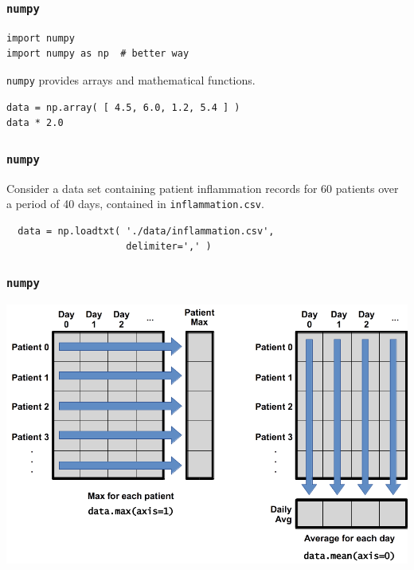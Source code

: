 \documentclass[11pt]{beamer}
\begin{document}
\begin{frame}[fragile]
  \frametitle{\texttt{numpy}}
  \Enlarge

  \begin{Verbatim}
import numpy
import numpy as np  # better way
  \end{Verbatim}
  \begin{enumerate}
  \myitem  \texttt{numpy} provides arrays and mathematical functions.
  \end{enumerate}
  \begin{Verbatim}
data = np.array( [ 4.5, 6.0, 1.2, 5.4 ] )
data * 2.0
  \end{Verbatim}
\end{frame}

\begin{frame}[fragile]
  \frametitle{\texttt{numpy}}
  \Enlarge

  Consider a data set containing patient inflammation records for 60 patients over a period of 40 days, contained in \texttt{inflammation.csv}.

  \begin{Verbatim}
  data = np.loadtxt( './data/inflammation.csv',
                     delimiter=',' )
  \end{Verbatim}
\end{frame}

\begin{frame}[fragile]
  \frametitle{\texttt{numpy}}
  \Enlarge

  \includegraphics[width=\textwidth]{./img/axes.png}
\end{frame}
\end{document}
